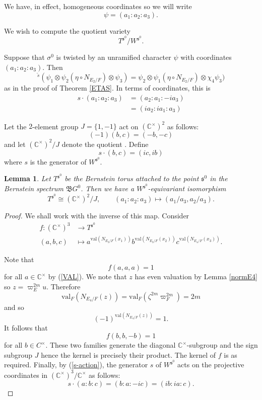 \documentclass[11pt]{amsart}
\newtheorem{lemma}[theorem]{Lemma}
\theoremstyle{remark}
\theoremstyle{definition}
\newcommand{\C}{\mathbb{C}}
\newcommand{\nr}{\mathrm{nr}}
\def\val{\mathrm{val}}
\newcommand{\fs}{\mathfrak{s}}
\begin{document}
  We have, in effect, homogeneous coordinates so we will write 
\[
\psi = (a_1: a_2 : a_3 ).
\]

We wish to compute the quotient variety
\[
T^{\fs^0} / W^{\fs^0}.
\]

 Suppose that $\sigma^0$ is twisted by an unramified character $\psi$ with coordinates $(a_1: a_2 : a_3)$. Then 
 \[
 {}^{\widetilde{s}}(\psi_1 \otimes \psi_2 ( \eta \circ N_{E_2/F}) \otimes \psi_3) = \psi_2 \otimes \psi_1 ( \eta \circ N_{E_2/F}) \otimes \chi_4 \psi_3)
 \] 
 as in the proof of Theorem \ref{ETAS}.   In terms of coordinates, this is
 \begin{align}\label{s-action}
s \cdot (a_1: a_2 : a_3) &= (a_2 : a_1: -ia_3)\\
& = (ia_2: ia_1: a_3)
\end{align}

Let the $2$-element group $J = \{1, -1\}$ act on $(\C^\times)^2$ as follows:
 \[
 (-1)(b,c) = (-b, -c)
 \]
 and let $(\C^\times)^2 / J $ denote the quotient .   Define
 \[
 s \cdot (b,c) = (ic,ib)
 \]
 where $s$ is the generator of $W^{\fs^0}$.   
 

\begin{lemma}    Let $T^{\fs^0}$ be the Bernstein torus attached to the point $\fs^0$ in the Bernstein spectrum $\mathfrak{B}G^0$.   Then we have a $W^{\fs^0}$-equivariant isomorphism
\[
  T^{\fs^0} \cong (\C^\times)^2 / J, \qquad (a_1: a_2: a_3) \mapsto (a_1/a_3, a_2/a_3).   
\]
\end{lemma}
\begin{proof}   We shall work with the inverse of this map.   Consider
\begin{align*} f \colon (\C^\times)^3 & \to T^{\fs^0} \\
(a,b,c)  & \mapsto  a^{\val(N_{E_2/F}(x_1))} b^{\val(N_{E_2/F}(x_2))} c^{\val(N_{E_4/F}(x_3))}.
\end{align*}

Note that 
\[
f(a,a,a) = 1
\]
for all $a \in \C^\times$ by (\ref{VAL}).    
  We note that $z$ has even valuation by Lemma \ref{normE4} so $z = \varpi_E^{2m} u$.   Therefore 
\[
\val_F(N_{E_4/F}(z)) =  \val_F(\zeta^{2m} \varpi_F^{2m})  = 2m
\]
and so   
\[
(-1)^{\val(N_{E_4/F}(z))} = 1.
\]
It follows that 
\[
f(b,b, -b) = 1
\]
for all $b \in C^\times$. These two families generate the diagonal $\C^\times$-subgroup and the sign subgroup $J$ hence the kernel is precisely their product. The kernel of $f$ is as required.   
Finally, by (\ref{s-action}), the generator $s$ of $W^{\fs^0}$ acts on the projective coordinates in $(\C^\times)^3 / \C^\times$ as follows:
\[
s \cdot (a : b : c) = (b : a : -  ic) = (ib :ia : c).
\]
\end{proof}
\end{document}
